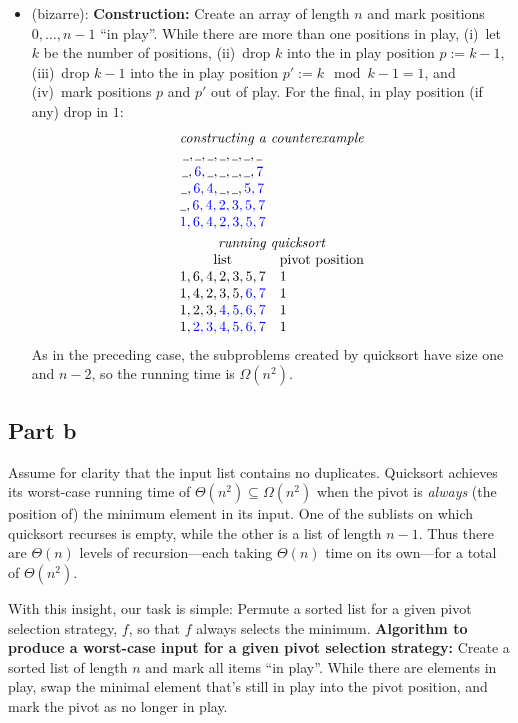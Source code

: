 \documentclass[a4paper]{article}
\begin{document}
\begin{itemize}
	\item (bizarre):
	\textbf{Construction:}
	Create an array of length $n$ and mark positions $0, \ldots, n-1$ ``in play''.
	While there are more than one positions in play,
	(i)~let $k$ be the number of positions,
	(ii)~drop $k$ into the in play position $p := k-1$,
	(iii)~drop $k-1$ into the in play position $p' := k \mod k-1 = 1$, and
	(iv)~mark positions $p$ and $p'$ out of play.
	For the final, in play position (if any) drop in $1$:
	\[
		\begin{array}{cl}
		\multicolumn{2}{c}{\text{\emph{constructing a counterexample}}} \\
		\HOLE, \HOLE, \HOLE, \HOLE, \HOLE, \HOLE, \HOLE \\
		\HOLE, \USED{6}, \HOLE, \HOLE, \HOLE, \HOLE, \USED{7} \\
		\HOLE, \USED{6, 4}, \HOLE, \HOLE, \USED{5, 7} \\
		\HOLE, \USED{6, 4, 2, 3, 5, 7} \\
		\USED{1, 6, 4, 2, 3, 5, 7} \\[\jot]
		\multicolumn{2}{c}{\text{\emph{running quicksort}}} \\
		\text{list} & \text{pivot position} \\
		1, 6, 4, 2, 3, 5, 7 & 1\\
		1, 4, 2, 3, 5, \USED{6, 7} & 1\\
		1, 2, 3, \USED{4, 5, 6, 7} & 1\\
		1, \USED{2, 3, 4, 5, 6, 7} & 1\\
		\end{array}
	\]
	As in the preceding case, the subproblems created by quicksort have size one and $n-2$, so the running time is $\Omega(n^2)$.
\end{itemize}

\subsection{Part b}

Assume for clarity that the input list contains no duplicates.
Quicksort achieves its worst-case running time of $\Theta(n^2) \subseteq \Omega(n^2)$ when the pivot is \emph{always} (the position of) the minimum element in its input.
One of the sublists on which quicksort recurses is empty, while the other is a list of length $n-1$.
Thus there are $\Theta(n)$ levels of recursion---each taking $\Theta(n)$ time on its own---for a total of $\Theta(n^2)$.

With this insight, our task is simple:
Permute a sorted list for a given pivot selection strategy, $f$, so that $f$ always selects the minimum.
\textbf{Algorithm to produce a worst-case input for a given pivot selection strategy:}
Create a sorted list of length $n$ and mark all items ``in play''.
While there are elements in play, swap the minimal element that's still in play into the pivot position, and mark the pivot as no longer in play.
\end{document}
